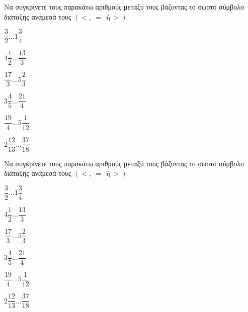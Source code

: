 Να συγκρίνετε τους παρακάτω αριθμούς μεταξύ τους βάζοντας το σωστό σύμβολο διάταξης ανάμεσά τους $ (<,\ =\ \ \textrm{ή}\ >) $.
\begin{multicols}{3}
\begin{rlist}[leftmargin=3mm]
\item $ \dfrac{3}{2}\ldots 1\dfrac{3}{4} $
\item $ 4\dfrac{1}{2}\ldots \dfrac{13}{3} $
\item $ \dfrac{17}{3}\ldots 5\dfrac{2}{3} $
\item $ 3\dfrac{4}{5}\ldots \dfrac{21}{4} $
\item $ \dfrac{19}{4}\ldots 5\dfrac{1}{12} $
\item $ 2\dfrac{12}{13}\ldots \dfrac{37}{18} $
\end{rlist}
\end{multicols}
Να συγκρίνετε τους παρακάτω αριθμούς μεταξύ τους βάζοντας το σωστό σύμβολο διάταξης ανάμεσά τους $ (<,\ =\ \ \textrm{ή}\ >) $.
\begin{multicols}{3}
\begin{rlist}[leftmargin=3mm]
\item $ \dfrac{3}{2}\ldots 1\dfrac{3}{4} $
\item $ 4\dfrac{1}{2}\ldots \dfrac{13}{3} $
\item $ \dfrac{17}{3}\ldots 5\dfrac{2}{3} $
\item $ 3\dfrac{4}{5}\ldots \dfrac{21}{4} $
\item $ \dfrac{19}{4}\ldots 5\dfrac{1}{12} $
\item $ 2\dfrac{12}{13}\ldots \dfrac{37}{18} $
\end{rlist}
\end{multicols}

